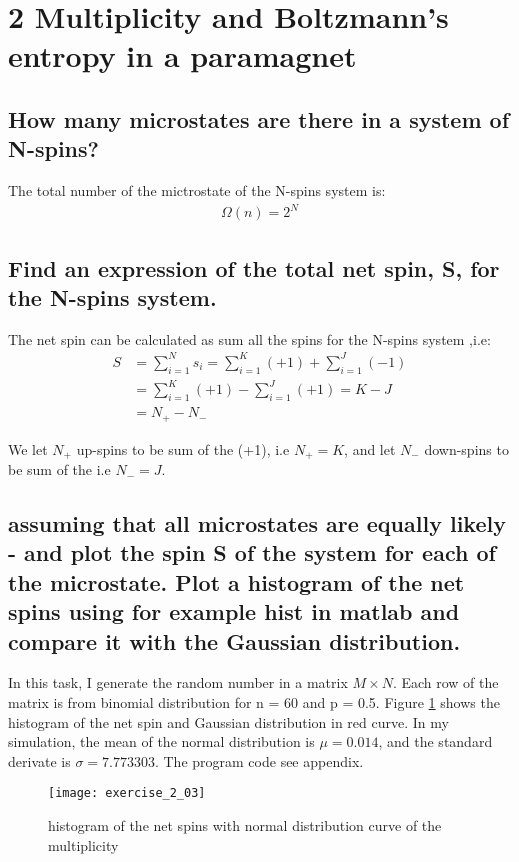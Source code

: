 \documentclass[a4paper,11pt]{article}
\begin{document}
\section{2 Multiplicity and Boltzmann's entropy in a paramagnet}


\subsection[2.1]{How many microstates are there in a system of N-spins?}

The total number of the mictrostate of the N-spins system  is:
\begin{align*}
\Omega (n) = 2^N
\end{align*}


\subsection[2.2]{Find an expression of the total net spin, S, for the N-spins system.}
The net spin can be calculated as sum all the spins for the N-spins system ,i.e:
\begin{align*}
S & = \sum_{i= 1}^{N} s_i 
= \sum_{i= 1}^{K} (+1) + \sum_{i= 1}^{J} (-1) \\
& =\sum_{i= 1}^{K} (+1) - \sum_{i= 1}^{J} (+1) = K-J\\
& = N_+ -N_-
\end{align*}

We let $N_+$ up-spins to be sum of the (+1), i.e $ N_+ =K$, and let $N_-$ down-spins to be sum of the i.e $ N_- = J$.


\subsection[2.3]{assuming that all microstates are equally likely - and plot the spin S of the system for each of the microstate. Plot a histogram of the net spins using for example hist in matlab and compare it with the Gaussian distribution.}

In this task, I generate the random number in a matrix  $M \times N$. Each row of the matrix is from binomial distribution for n = 60 and p = 0.5.  Figure \ref{fig:exercise203} shows the histogram of the net spin and Gaussian distribution in red curve. In my simulation, the mean of the normal distribution is $\mu = 0.014 $, and the standard derivate is $\sigma = 7.773303$.  The program code see appendix.


\begin{figure}[H]
	\centering
	\texttt{[image: exercise\_2\_03]}
	\caption{histogram of the net spins with normal distribution curve of the multiplicity}
	\label{fig:exercise203}
\end{figure}
\end{document}
